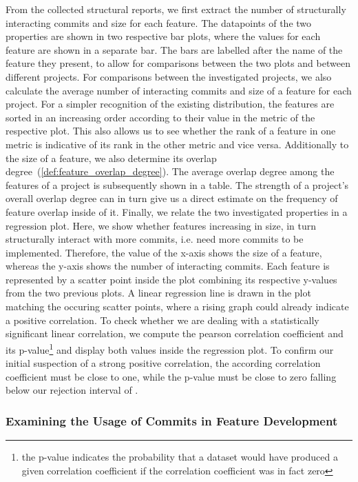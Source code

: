 From the collected structural reports, we first extract the number of structurally interacting commits and size for each feature.
The datapoints of the two properties are shown in two respective bar plots, where the values for each feature are shown in a separate bar.
The bars are labelled after the name of the feature they present, to allow for comparisons between the two plots and between different projects.
For comparisons between the investigated projects, we also calculate the average number of interacting commits and size of a feature for each project.
For a simpler recognition of the existing distribution, the features are sorted in an increasing order according to their value in the metric of the respective plot.
This also allows us to see whether the rank of a feature in one metric is indicative of its rank in the other metric and vice versa.
Additionally to the size of a feature, we also determine its overlap degree~(\ref{def:feature_overlap_degree}).
The average overlap degree among the features of a project is subsequently shown in a table.
The strength of a project's overall overlap degree can in turn give us a direct estimate on the frequency of feature overlap inside of it.
Finally, we relate the two investigated properties in a regression plot.
Here, we show whether features increasing in size, in turn structurally interact with more commits, i.e. need more commits to be implemented.
Therefore, the value of the x-axis shows the size of a feature, whereas the y-axis shows the number of interacting commits.
Each feature is represented by a scatter point inside the plot combining its respective y-values from the two previous plots.
A linear regression line is drawn in the plot matching the occuring scatter points, where a rising graph could already indicate a positive correlation.
To check whether we are dealing with a statistically significant linear correlation, we compute the pearson correlation coefficient and its p-value\footnote{the p-value indicates the probability that a dataset would have produced a given correlation coefficient if the correlation coefficient was in fact zero} and display both values inside the regression plot.
To confirm our initial suspection of a strong positive correlation, the according correlation coefficient must be close to one, while the p-value must be close to zero falling below our rejection interval of .

\subsubsection*{Examining the Usage of Commits in Feature Development}

